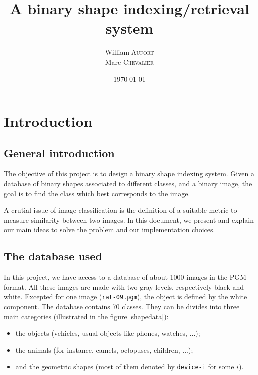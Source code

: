 

\title{A binary shape indexing/retrieval system}
\author{
    William \textsc{Aufort}\\
    Marc \textsc{Chevalier}
}
\date{\today}


\maketitle

\section*{Introduction}

\subsection*{General introduction}

The objective of this project is to design a binary shape indexing system. Given a database of binary shapes associated to different classes, and a binary image, the goal is to find the class which best corresponds to the image.

A crutial issue of image classification is the definition of a suitable metric to measure similarity between two images. In this document, we present and explain our main ideas to solve the problem and our implementation choices.

\subsection*{The database used}

In this project, we have access to a database of about 1000 images in the PGM format. All these images are made with two gray levels, respectively black and white. Excepted for one image (\texttt{rat-09.pgm}), the object is defined by the white component. The database contains 70 classes. They can be divides into three main categories (illustrated in the figure 	\ref{shapedata}):
\begin{itemize}
	\item the objects (vehicles, usual objects like phones, watches, ...);
	\item the animals (for instance, camels, octopuses, children, ...);
	\item and the geometric shapes (most of them denoted by \texttt{device-i} for some $i$).
\end{itemize}


